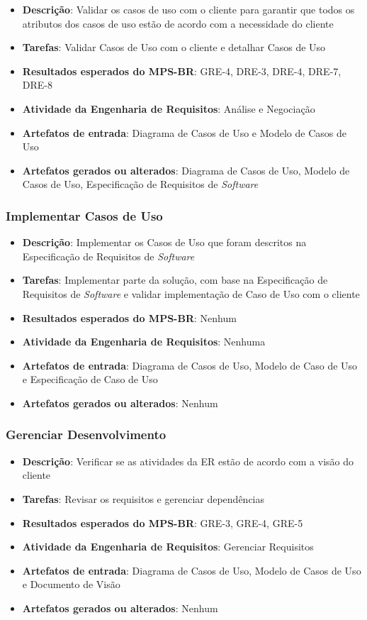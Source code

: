 \begin{itemize}
\item \textbf{Descrição}: Validar os casos de uso com o cliente para garantir que todos os atributos dos casos de uso estão de acordo com a necessidade do cliente
\item \textbf{Tarefas}: Validar Casos de Uso com o cliente e detalhar Casos de Uso
\item \textbf{Resultados esperados do MPS-BR}: GRE-4, DRE-3, DRE-4, DRE-7, DRE-8
\item \textbf{Atividade da Engenharia de Requisitos}: Análise e Negociação
\item \textbf{Artefatos de entrada}: Diagrama de Casos de Uso e Modelo de Casos de Uso
\item \textbf{Artefatos gerados ou alterados}: Diagrama de Casos de Uso, Modelo de Casos de Uso, Especificação de Requisitos de \textit{Software}
\end{itemize}

\subsubsection{Implementar Casos de Uso}

\begin{itemize}
\item \textbf{Descrição}: Implementar os Casos de Uso que foram descritos na Especificação de Requisitos de \textit{Software}
\item \textbf{Tarefas}: Implementar parte da solução, com base na Especificação de Requisitos de \textit{Software} e validar implementação de Caso de Uso com o cliente
\item \textbf{Resultados esperados do MPS-BR}: Nenhum
\item \textbf{Atividade da Engenharia de Requisitos}: Nenhuma
\item \textbf{Artefatos de entrada}: Diagrama de Casos de Uso, Modelo de Caso de Uso e Especificação de Caso de Uso
\item \textbf{Artefatos gerados ou alterados}: Nenhum
\end{itemize}

\subsubsection{Gerenciar Desenvolvimento}

\begin{itemize}
\item \textbf{Descrição}: Verificar se as atividades da ER estão de acordo com a visão do cliente
\item \textbf{Tarefas}: Revisar os requisitos e gerenciar dependências
\item \textbf{Resultados esperados do MPS-BR}: GRE-3, GRE-4, GRE-5
\item \textbf{Atividade da Engenharia de Requisitos}: Gerenciar Requisitos
\item \textbf{Artefatos de entrada}: Diagrama de Casos de Uso, Modelo de Casos de Uso e Documento de Visão
\item \textbf{Artefatos gerados ou alterados}: Nenhum
\end{itemize}

